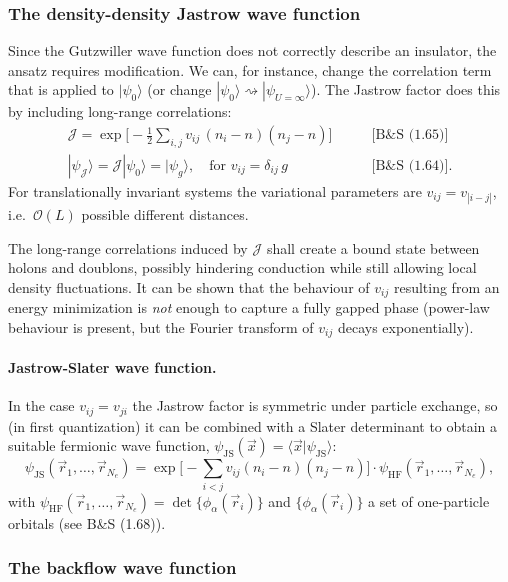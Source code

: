 \documentclass[../../main.tex]{subfiles}
\begin{document}
\subsubsection{The density-density Jastrow wave function}

Since the Gutzwiller wave function does not correctly describe an insulator, the
ansatz requires modification. We can, for instance, change the correlation term
that is applied to $|\psi_0\rangle$ (or change $|\psi_0\rangle\rightsquigarrow
|\psi_{U=\infty}\rangle$). The Jastrow factor does this by including long-range
correlations:
\begin{align}
\mathcal J=\exp\Big[-\frac{1}{2}\sum_{i,j}v_{ij}\,(n_i-n)(n_j-n)\Big]
&\qquad\text{[B\&S~(1.65)]}\\
|\psi_{\mathcal J}\rangle=\mathcal J|\psi_0\rangle=|\psi_g\rangle,
\quad\text{for } v_{ij}=\delta_{ij}\,g
&\qquad\text{[B\&S~(1.64)]}.
\end{align}
For translationally invariant systems the variational parameters are
$v_{ij}=v_{|i-j|}$, i.e.\ $\mathcal O(L)$ possible different distances.

The long-range correlations induced by $\mathcal J$ shall create a bound state
between holons and doublons, possibly hindering conduction while still allowing
local density fluctuations. It can be shown that the behaviour of $v_{ij}$
resulting from an energy minimization is \emph{not} enough to capture a fully
gapped phase (power-law behaviour is present, but the Fourier transform of
$v_{ij}$ decays exponentially).

\paragraph{Jastrow-Slater wave function.}
In the case $v_{ij}=v_{ji}$ the Jastrow factor is symmetric under particle
exchange, so (in first quantization) it can be combined with a Slater determinant
to obtain a suitable fermionic wave function,
$\psi_{\mathrm{JS}}(\vec x)=\langle\vec x|\psi_{\mathrm{JS}}\rangle$:
\begin{equation}
\psi_{\mathrm{JS}}(\vec r_1,\dots,\vec r_{N_e})
=\exp\Big[-\sum_{i<j}v_{ij}(n_i-n)(n_j-n)\Big]\cdot
\psi_{\mathrm{HF}}(\vec r_1,\dots,\vec r_{N_e}),
\end{equation}
with $\psi_{\mathrm{HF}}(\vec r_1,\dots,\vec r_{N_e})=\det\{\phi_\alpha(\vec r_i)\}$
and $\{\phi_\alpha(\vec r_i)\}$ a set of one-particle orbitals (see B\&S (1.68)).

\subsubsection{The backflow wave function}
\end{document}
